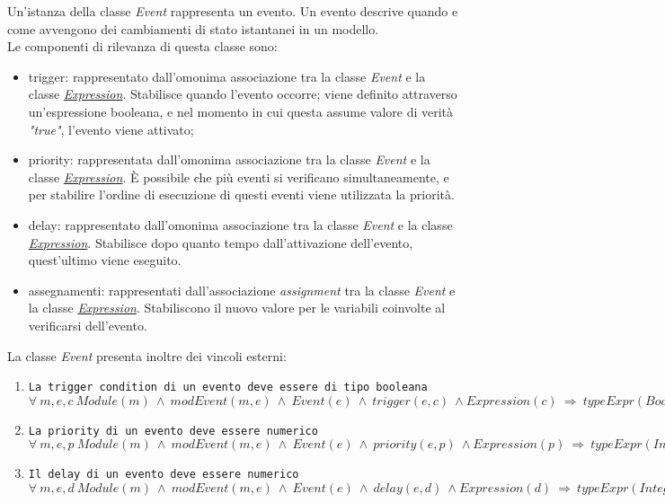 
Un'istanza della classe \textit{Event} rappresenta un evento. Un evento descrive quando e come avvengono dei cambiamenti di stato istantanei in un modello. \\
Le componenti di rilevanza di questa classe sono:
\begin{itemize}
	\item trigger: rappresentato dall'omonima associazione tra la classe \textit{Event} e la classe \hyperref[sec:modelstranslator:analysis:model_analysis:expression]{\textit{Expression}}. Stabilisce quando l'evento occorre; viene definito attraverso un'espressione booleana, e nel momento in cui questa assume valore di verità \textit{"true"}, l'evento viene attivato;
	\item priority: rappresentata dall'omonima associazione tra la classe \textit{Event} e la classe \hyperref[sec:modelstranslator:analysis:model_analysis:expression]{\textit{Expression}}. È possibile che più eventi si verificano simultaneamente, e per stabilire l'ordine di esecuzione di questi eventi viene utilizzata la priorità.
	\item delay: rappresentato dall'omonima associazione tra la classe \textit{Event} e la classe \hyperref[sec:modelstranslator:analysis:model_analysis:expression]{\textit{Expression}}. Stabilisce dopo quanto tempo dall'attivazione dell'evento, quest'ultimo viene eseguito.
	\item assegnamenti: rappresentati dall'associazione \textit{assignment} tra la classe \textit{Event} e la classe \hyperref[sec:modelstranslator:analysis:model_analysis:expression]{\textit{Expression}}. Stabiliscono il nuovo valore per le variabili coinvolte al verificarsi dell'evento.
\end{itemize}
La classe \textit{Event} presenta inoltre dei vincoli esterni:
\begin{enumerate}
	\item \texttt{La trigger condition di un evento deve essere di tipo booleana} \\
		  $\forall \ m,e,c \ Module(m) \ \land \ modEvent(m, e) \ \land \ Event(e) \ \land \ trigger(e, c) \ \land Expression(c) \ \Rightarrow \ typeExpr(Boolean, c)$ \\
	\item \texttt{La priority di un evento deve essere numerico} \\
		  $\forall \ m,e,p \ Module(m) \ \land \ modEvent(m, e) \ \land \ Event(e) \ \land \ priority(e, p) \ \land Expression(p) \ \Rightarrow \ typeExpr(Integer, p) \ \lor \ typeExpr(Real, p)$ \\
	\item \texttt{Il delay di un evento deve essere numerico} \\
		  $\forall \ m,e,d \ Module(m) \ \land \ modEvent(m, e) \ \land \ Event(e) \ \land \ delay(e, d) \ \land Expression(d) \ \Rightarrow \ typeExpr(Integer, d) \ \lor \ typeExpr(Real, d)$ \\
\end{enumerate}